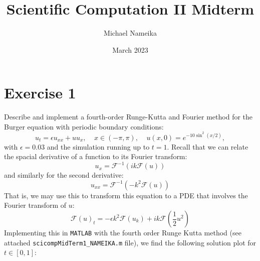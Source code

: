 \documentclass{article}
\title{Scientific Computation II Midterm}
\author{Michael Nameika}
\date{March 2023}
\begin{document}
\maketitle

\section*{Exercise 1}
Describe and implement a fourth-order Runge-Kutta and Fourier method for the Burger equation with periodic boundary conditions:
\[u_t = \epsilon u_{xx} + uu_{x}, \:\:\:\:\: x \in (-\pi, \pi), \:\:\:\:\:u(x,0) = e^{-10\sin^2(x/2)},\]
with $\epsilon = 0.03$ and the simulation running up to $t = 1$.
\newline\newline
Recall that we can relate the spacial derivative of a function to its Fourier transform:
\[u_x = \mathcal{F}^{-1}(ik\mathcal{F}(u))\]
and similarly for the second derivative:
\[u_{xx} = \mathcal{F}^{-1}(-k^2\mathcal{F}(u))\]
That is, we may use this to transform this equation to a PDE that involves the Fourier transform of $u$:
\[\mathcal{F}(u)_t = -\epsilon k^2 \mathcal{F}(u_k) + ik \mathcal{F}\left(\frac{1}{2}u^2\right)\]
Implementing this in \verb+MATLAB+ with the fourth order Runge Kutta method (see attached \verb+scicompMidTerm1_NAMEIKA.m+ file), we find the following solution plot for $t \in [0,1]$:
\end{document}
